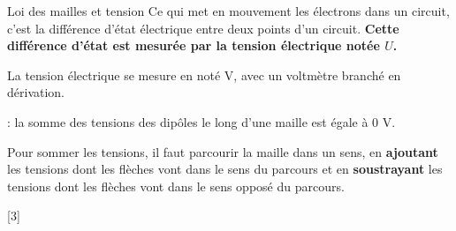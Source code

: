 \begin{doc}{Loi des mailles et tension}
  Ce qui met en mouvement les électrons dans un circuit, c'est la différence d'état électrique entre deux points d'un circuit.
  \textbf{Cette différence d'état est mesurée par la tension électrique notée $U$.}
  \begin{importants}
    La tension électrique se mesure en  noté V, avec un voltmètre branché en dérivation.
  \end{importants}
  \begin{importants}
     : la somme des tensions des dipôles le long d'une maille est égale à 0 V.
  \end{importants}
  \chevron Pour sommer les tensions, il faut parcourir la maille dans un sens, en \textbf{ajoutant} les tensions dont les flèches vont dans le sens du parcours et en \textbf{soustrayant} les tensions dont les flèches vont dans le sens opposé du parcours.
\end{doc}

[3]
